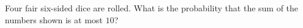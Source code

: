 Four fair six-sided dice are rolled. What is the probability that the sum of the numbers shown is at most $10$?
